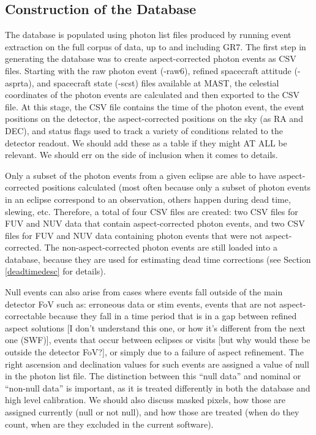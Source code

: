 \documentclass[5p]{elsarticle}
\begin{document}
\subsection{Construction of the Database}
The database is populated using photon list files produced by running event extraction on the full corpus of data, up to and including GR7.  The first step in generating the database was to create aspect-corrected photon events as CSV files.  Starting with the raw photon event (-raw6), refined spacecraft attitude (-asprta), and spacecraft state (-scst) files available at MAST, the celestial coordinates of the photon events are calculated and then exported to the CSV file.  At this stage, the CSV file contains the time of the photon event, the event positions on the detector, the aspect-corrected positions on the sky (as RA and DEC), and status flags used to track a variety of conditions related to the detector readout. {\color{red}We should add these as a table if they might AT ALL be relevant.  We should err on the side of inclusion when it comes to details.}

Only a subset of the photon events from a given eclipse are able to have aspect-corrected positions calculated (most often because only a subset of photon events in an eclipse correspond to an observation, others happen during dead time, slewing, etc.  Therefore, a total of four CSV files are created: two CSV files for FUV and NUV data that contain aspect-corrected photon events, and two CSV files for FUV and NUV data containing photon events that were not aspect-corrected.  The non-aspect-corrected photon events are still loaded into a database, because they are used for estimating dead time corrections (see Section \ref{deadtimedesc} for details).

Null events can also arise from cases where events fall outside of the main detector FoV such as: erroneous data or stim events, {\color{red}events that are not aspect-correctable because they fall in a time period that is in a gap between refined aspect solutions [I don't understand this one, or how it's different from the next one (SWF)]}, events that occur between eclipses or visits {\color{red}[but why would these be outside the detector FoV?]}, or simply due to a failure of aspect refinement. The right ascension and declination values for such events are assigned a value of null in the photon list file. The distinction between this ``null data'' and nominal or ``non-null data'' is important, as it is treated differently in both the database and high level calibration.  {\color{red}We should also discuss masked pixels, how those are assigned currently (null or not null), and how those are treated (when do they count, when are they excluded in the current software).}
\end{document}
